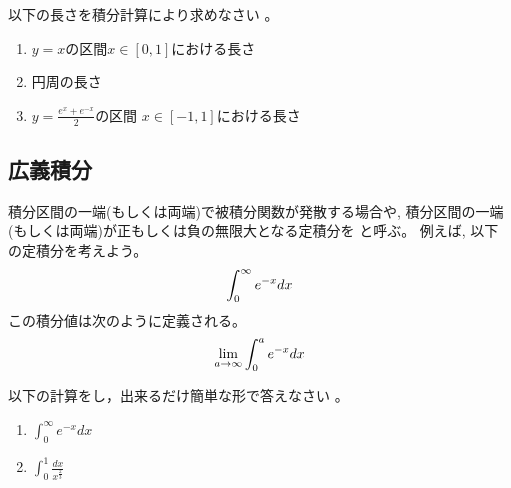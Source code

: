\documentclass[twocolumn,11pt]{jarticle}
\begin{document}
\exercise
以下の長さを積分計算により求めなさい
。
\begin{enumerate}
\item $y=x$の区間$x\in[0,1]$における長さ
\item 円周の長さ
\item \label{item:hcos}$\displaystyle y=\frac{e^x+e^{-x}}{2}$の区間
  $x\in[-1,1]$における長さ
\end{enumerate}

\subsection{広義積分}

積分区間の一端(もしくは両端)で被積分関数が発散する場合や,
積分区間の一端(もしくは両端)が正もしくは負の無限大となる定積分を
と呼ぶ。
例えば, 以下の定積分を考えよう。
\begin{align}
  \int_0^{\infty}e^{-x}dx\notag
\end{align}
この積分値は次のように定義される。
\begin{align}
  \lim_{a\to \infty}\int_0^{a}e^{-x}dx\notag
\end{align}

\question
以下の計算をし，出来るだけ簡単な形で答えなさい
。
\begin{enumerate}
\item\label{eq:int2:e^(-x)}   $\displaystyle\int_0^{\infty}e^{-x}dx$
\item\label{eq:int2:x^(-2/3)}   $\displaystyle\int_0^1\frac{dx}{x^{\frac{2}{3}}}$
\end{enumerate}
\end{document}
